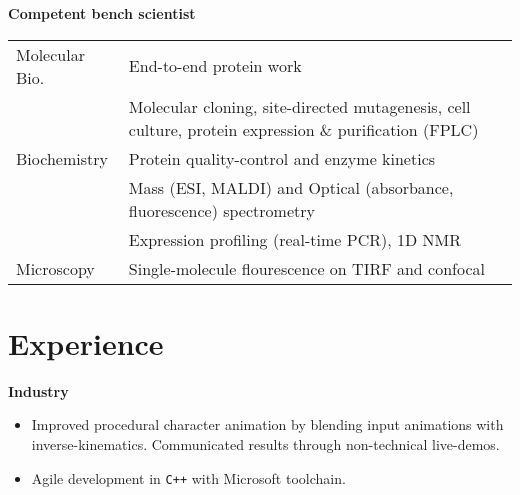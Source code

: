 \documentclass[margin]{res}
\begin{document}
\begin{sloppypar}
\begin{resume}
\textbf{Competent bench scientist} \\
\begin{tabular}{l p{3in}}
Molecular Bio. & End-to-end protein work \\
               & Molecular cloning, site-directed mutagenesis, cell culture, protein expression \& purification (FPLC) \\
Biochemistry & Protein quality-control and enzyme kinetics \\ 
             & Mass (ESI, MALDI) and Optical (absorbance, fluorescence) spectrometry \\
             & Expression profiling (real-time PCR), 1D NMR \\
Microscopy   & Single-molecule flourescence on TIRF and confocal \\
\end{tabular}

\section{Experience}
\textbf{Industry} \\
\begin{itemize}
\item Improved procedural character animation by blending input animations with inverse-kinematics. Communicated results through non-technical live-demos.
\item Agile development in \texttt{C++} with Microsoft toolchain.
\end{itemize}


\end{resume}
\end{sloppypar}
\end{document}
